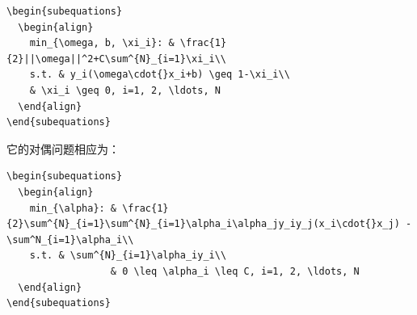 \documentclass[11pt]{ctexart}
\begin{document}
\begin{enumerate}
\lstset{language=[LaTeX]TeX,label= ,caption= ,captionpos=b,numbers=none}
\begin{lstlisting}
\begin{subequations}
  \begin{align}
    min_{\omega, b, \xi_i}: & \frac{1}{2}||\omega||^2+C\sum^{N}_{i=1}\xi_i\\
    s.t. & y_i(\omega\cdot{}x_i+b) \geq 1-\xi_i\\
    & \xi_i \geq 0, i=1, 2, \ldots, N
  \end{align}
\end{subequations}
\end{lstlisting}

它的对偶问题相应为：

\lstset{language=[LaTeX]TeX,label= ,caption= ,captionpos=b,numbers=none}
\begin{lstlisting}
\begin{subequations}
  \begin{align}
    min_{\alpha}: & \frac{1}{2}\sum^{N}_{i=1}\sum^{N}_{i=1}\alpha_i\alpha_jy_iy_j(x_i\cdot{}x_j) - \sum^N_{i=1}\alpha_i\\
    s.t. & \sum^{N}_{i=1}\alpha_iy_i\\
                  & 0 \leq \alpha_i \leq C, i=1, 2, \ldots, N
  \end{align}
\end{subequations}
\end{lstlisting}
\end{enumerate}
\end{document}
